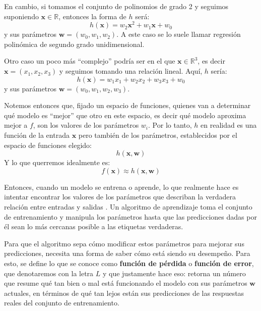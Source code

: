 \documentclass[../../main.tex]{subfiles}
\begin{document}
En cambio, si tomamos el conjunto de polinomios de grado 2 y seguimos suponiendo
\(\mathbf{x} \in \mathbb{R}\), entonces la forma de \(h\) será:
\[h(\mathbf{x}) = w_2 \mathbf{x}^2 + w_1 \mathbf{x} + w_0\] y sus parámetros
\(\bm{w}=(w_0, w_1, w_2)\). A este caso se lo suele llamar regresión polinómica de segundo
grado unidimensional.

Otro caso un poco más ``complejo'' podría ser en el que \(\mathbf{x} \in \mathbb{R}^3\), es decir
\(\mathbf{x}=(x_1, x_2, x_3)\) y seguimos tomando una relación lineal. Aquí, \(h\) sería:
\[h(\mathbf{x}) = w_1 x_1 + w_2 x_2 + w_3 x_3 + w_0\] y sus parámetros \(\bm{w}=(w_0, w_1,
w_2, w_3)\)\footnotemark. 

Notemos entonces que, fijado un espacio de funciones, quienes van a determinar qué modelo
es ``mejor'' que otro en este espacio, es decir qué modelo aproxima mejor a \(f\), son los
valores de los parámetros \(w_i\). Por lo tanto, \(h\) en realidad es una función de la
entrada \(\mathbf{x}\) pero también de los parámetros, establecidos por el espacio de funciones
elegido:
\[h(\mathbf{x}, \bm{w})\]
Y lo que querremos idealmente es:
\[f(\mathbf{x}) \approx h(\mathbf{x}, \bm{w})\]

Entonces, cuando un modelo se entrena o aprende, lo que realmente hace es intentar
encontrar los valores de los parámetros que describan la verdadera relación entre entradas
y salidas \cite{prince2024understanding}. Un algoritmo de aprendizaje toma el conjunto de
entrenamiento y manipula los parámetros hasta que las predicciones dadas por él sean lo
más cercanas posible a las etiquetas verdaderas.

Para que el algoritmo sepa cómo modificar estos parámetros para mejorar sus predicciones,
necesita una forma de saber cómo está siendo su desempeño. Para esto, se define lo que se
conoce como \textbf{función de pérdida} o \textbf{función de error}, que denotaremos con
la letra \(L\) y que justamente hace eso: retorna un número que resume qué tan bien o mal
está funcionando el modelo con sus parámetros \(\bm{w}\) actuales, en términos de qué tan
lejos están sus predicciones de las respuestas reales del conjunto de entrenamiento.
\end{document}
